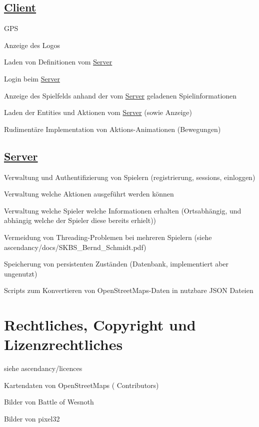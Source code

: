 \subsection*{\hyperlink{namespaceClient}{Client}}


\begin{DoxyItemize}
\item G\+P\+S
\item Anzeige des Logos
\item Laden von Definitionen vom \hyperlink{namespaceServer}{Server}
\item Login beim \hyperlink{namespaceServer}{Server}
\item Anzeige des Spielfelds anhand der vom \hyperlink{namespaceServer}{Server} geladenen Spielinformationen
\item Laden der Entities und Aktionen vom \hyperlink{namespaceServer}{Server} (sowie Anzeige)
\item Rudimentäre Implementation von Aktions-\/\+Animationen (Bewegungen)
\end{DoxyItemize}

\subsection*{\hyperlink{namespaceServer}{Server}}


\begin{DoxyItemize}
\item Verwaltung und Authentifizierung von Spielern (registrierung, sessions, einloggen)
\item Verwaltung welche Aktionen ausgeführt werden können
\item Verwaltung welche Spieler welche Informationen erhalten (Ortsabhängig, und abhängig welche der Spieler diese bereits erhielt))
\item Vermeidung von Threading-\/\+Problemen bei mehreren Spielern (siehe ascendancy/docs/\+S\+K\+B\+S\+\_\+\+Bernd\+\_\+\+Schmidt.\+pdf)
\item Speicherung von persistenten Zuständen (Datenbank, implementiert aber ungenutzt)
\item Scripts zum Konvertieren von Open\+Street\+Maps-\/\+Daten in nutzbare J\+S\+O\+N Dateien
\end{DoxyItemize}

\section*{Rechtliches, Copyright und Lizenzrechtliches}

siehe ascendancy/licences
\begin{DoxyItemize}
\item Kartendaten von Open\+Street\+Maps ( Contributors)
\item Bilder von Battle of Wesnoth
\item Bilder von pixel32 
\end{DoxyItemize}